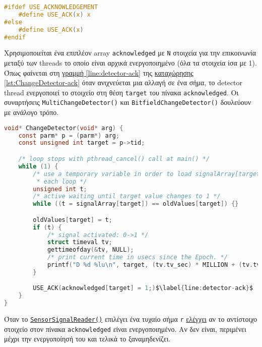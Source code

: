 \begin{lstlisting}[language=c, caption={Ορισμός του USE\_ACK()}, label={lst:use_ack}]
#ifdef USE_ACKNOWLEDGEMENT
    #define USE_ACK(x) x
#else
    #define USE_ACK(x)
#endif
\end{lstlisting}

Χρησιμοποιείται ένα επιπλέον array \lstinline!acknowledged! με \lstinline!N! στοιχεία για την επικοινωνία μεταξύ των threads το οποίο είναι αρχικά ενεργοποιημένο (όλα τα στοιχεία ίσα με 1).
Όπως φαίνεται στη 
\hyperref[line:detector-ack]{γραμμή \ref*{line:detector-ack}}
της
\hyperref[lst:ChangeDetector-ack]{καταχώρησης \ref*{lst:ChangeDetector-ack}}
όταν ανιχνεύεται μια αλλαγή σε ένα σήμα, το detector thread ενεργοποιεί το στοιχείο στη θέση \lstinline!target! του πίνακα \lstinline!acknowledged!.
Οι συναρτήσεις 
\lstinline!MultiChangeDetector()! και 
\lstinline!BitfieldChangeDetector()! δουλεύουν με ανάλογο τρόπο.

\begin{lstlisting}[language=c, caption={ChangeDetector() με χρήση array acknowledged}, escapechar=$, label={lst:ChangeDetector-ack}]
void* ChangeDetector(void* arg) {
    const parm* p = (parm*) arg;
    const unsigned int target = p->tid;

    /* loop stops with pthread_cancel() call at main() */
    while (1) {
        /* use a temporary variable in order to load signalArray[target] once in
         * each loop */
        unsigned int t;
        /* active waiting until target value changes to 1 */
        while ((t = signalArray[target]) == oldValues[target]) {}

        oldValues[target] = t;
        if (t) {
            /* signal activated: 0->1 */
            struct timeval tv;
            gettimeofday(&tv, NULL);
            /* print current time in usecs since the Epoch. */
            printf("D %d %lu\n", target, (tv.tv_sec) * MILLION + (tv.tv_usec));
        }

        USE_ACK(acknowledged[target] = 1;)$\label{line:detector-ack}$
    }
}
\end{lstlisting}

Όταν το \hyperref[lst:reader-ack]{\lstinline!SensorSignalReader()!}
επιλέγει ένα τυχαίο σήμα \lstinline!r!
\hyperref[line:reader-wait-ack]{ελέγχει} αν το αντίστοιχο στοιχείο στον πίνακα 
\lstinline!acknowledged! είναι ενεργοποιημένο.
Αν δεν είναι, περιμένει μέχρι την ενεργοποίησή του και τελικά το ξαναμηδενίζει.

